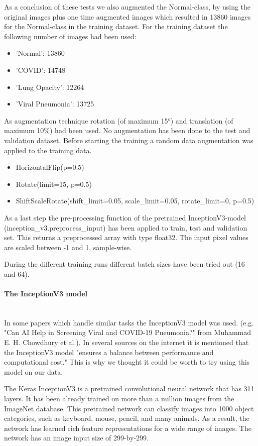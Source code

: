 \documentclass{article}
\begin{document}
As a conclusion of these tests we also augmented the Normal-class, by using the original images plus one time augmented images which resulted in 13860 images for the Normal-class in the training dataset. For the training dataset the following number of images had been used: 
\begin{itemize}
\item 'Normal':  13860
\item 'COVID':  14748
\item 'Lung Opacity': 12264 
\item 'Viral Pneumonia':  13725
\end{itemize}
As augmentation technique rotation (of maximum 15°) and translation (of maximum 10\%) had been used. 
No augmentation has been done to the test and validation dataset. 
Before starting the training a random data augmentation was applied to the training data.
\begin{itemize}
\item HorizontalFlip(p=0.5)
\item Rotate(limit=15, p=0.5)
\item ShiftScaleRotate(shift\_limit=0.05, scale\_limit=0.05, rotate\_limit=0, p=0.5) 
\end{itemize}

As a last step the pre-processing function of the pretrained InceptionV3-model (inception\_v3.preprocess\_input) has been applied to train, test and validation set. This returns a preprocessed array with type float32. The input pixel values are scaled between -1 and 1, sample-wise. 

During the different training runs different batch sizes have been tried out (16 and 64). 

\paragraph{The InceptionV3 model}\mbox{}\\
In some papers which handle similar tasks the InceptionV3 model was used. (e.g. "Can AI Help in Screening Viral and COVID-19 Pneumonia?" from Muhammad E. H. Chowdhury et al.). In several sources on the internet it is mentioned that the InceptionV3 model "ensures a balance between performance and computational cost." This is why we thought it could be worth to try using this model on our data. 

The Keras InceptionV3 is a pretrained convolutional neural network that has 311 layers. It has been already trained on more than a million images from the ImageNet database. This pretrained network can classify images into 1000 object categories, such as keyboard, mouse, pencil, and many animals. As a result, the network has learned rich feature representations for a wide range of images. The network has an image input size of 299-by-299. 
\end{document}
